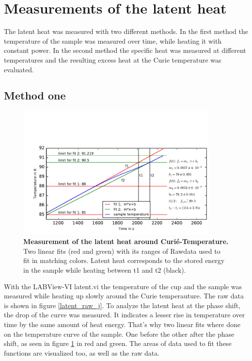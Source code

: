 \documentclass{include/thesisclass3}
\begin{document}
\section{Measurements of the latent heat}
The latent heat was measured with two different methods. In the first method the temperature of the sample was measured over time, while heating it with constant power. In the second method the specific heat was measured at different temperatures and the resulting excess heat at the Curie temperature was evaluated.
\subsection{Method one}
\begin{figure}[h]
\includegraphics[width = 0.9\textwidth]{fig/latent_j.pdf}
\caption{\label{latent_j}\textbf{Measurement of the latent heat around Curié-Temperature.} Two linear fits (red and green) with its ranges of Rawdata used to fit in matching colors. Latent heat corresponds to the stored energy in the sample while heating between t1 and t2 (black).}
\end{figure}
With the LABView-VI latent.vi the temperature of the cup and the sample was measured while heating up slowly around the Curie temperauture. The raw data is shown in figure \ref{latent_raw_j}. To analyze the latent heat at the phase shift, the drop of the curve was measured. It indicates a lesser rise in temperature over time by the same amount of heat energy. That's why two linear fits where done on the temperature curve of the sample. One before the other after the phase shift, as seen in figure \ref{latent_j} in red and green. The areas of data used to fit these functions are visualized too, as well as the raw data. 
\end{document}

